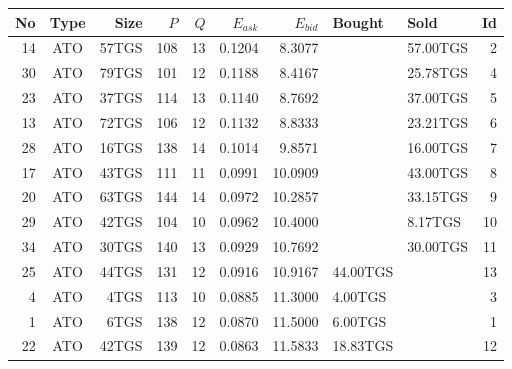 \begin{tabular}{|r|c|r|r|r|r|r|p{2cm}|p{2cm}|r|}
\hline

No & Type & Size & $P$ & $Q$ & $E_{ask}$ & $E_{bid}$ & Bought & Sold & Id \\
\hline
14 & ATO & 57TGS & 108 & 13 & 0.1204 & 8.3077 &    & 57.00TGS & 2 \\
\hline
30 & ATO & 79TGS & 101 & 12 & 0.1188 & 8.4167 &    & 25.78TGS & 4 \\
\hline
23 & ATO & 37TGS & 114 & 13 & 0.1140 & 8.7692 &    & 37.00TGS & 5 \\
\hline
13 & ATO & 72TGS & 106 & 12 & 0.1132 & 8.8333 &    & 23.21TGS & 6 \\
\hline
28 & ATO & 16TGS & 138 & 14 & 0.1014 & 9.8571 &    & 16.00TGS & 7 \\
\hline
17 & ATO & 43TGS & 111 & 11 & 0.0991 & 10.0909 &    & 43.00TGS & 8 \\
\hline
20 & ATO & 63TGS & 144 & 14 & 0.0972 & 10.2857 &    & 33.15TGS & 9 \\
\hline
29 & ATO & 42TGS & 104 & 10 & 0.0962 & 10.4000 &    & 8.17TGS & 10 \\
\hline
34 & ATO & 30TGS & 140 & 13 & 0.0929 & 10.7692 &    & 30.00TGS & 11 \\
\hline
25 & ATO & 44TGS & 131 & 12 & 0.0916 & 10.9167 & 44.00TGS &    & 13 \\
\hline
4 & ATO & 4TGS & 113 & 10 & 0.0885 & 11.3000 & 4.00TGS &    & 3 \\
\hline
1 & ATO & 6TGS & 138 & 12 & 0.0870 & 11.5000 & 6.00TGS &    & 1 \\
\hline
22 & ATO & 42TGS & 139 & 12 & 0.0863 & 11.5833 & 18.83TGS &    & 12 \\
\hline
\end{tabular}
